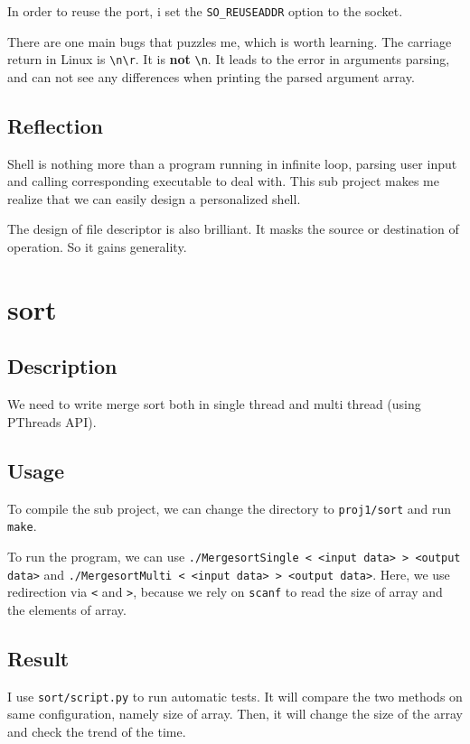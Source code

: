 In order to reuse the port, i set the \texttt{SO\_REUSEADDR} option to the socket.

There are one main bugs that puzzles me, which is worth learning.
The carriage return in Linux is \texttt{\textbackslash n\textbackslash r}. It is \textbf{not} \texttt{\textbackslash n}.
It leads to the error in arguments parsing, and can not see any differences when printing the parsed argument array.

\subsection{Reflection}
Shell is nothing more than a program running in infinite loop, parsing user input and calling corresponding executable to deal with.
This sub project makes me realize that we can easily design a personalized shell.

The design of file descriptor is also brilliant. It masks the source or destination of operation. So it gains generality.

\section{sort}
\subsection{Description}
We need to write merge sort both in single thread and multi thread (using PThreads API).

\subsection{Usage}
To compile the sub project, we can change the directory to \texttt{proj1/sort} and run \texttt{make}.

To run the program, we can use \texttt{./MergesortSingle < <input data> > <output data>} and 
\texttt{./MergesortMulti < <input data> > <output data>}.
Here, we use redirection via \texttt{<} and \texttt{>}, because we rely on \texttt{scanf} to read the 
size of array and the elements of array.

\subsection{Result}
I use \texttt{sort/script.py} to run automatic tests. It will compare the two methods on same configuration, namely size of array.
Then, it will change the size of the array and check the trend of the time.

